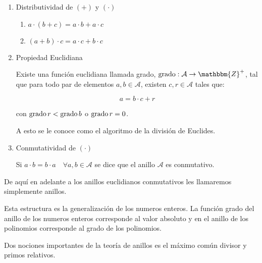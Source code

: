\begin{enumerate}
            \item Distributividad de $(+)$ y $(\cdot)$

            \begin{enumerate}
                \item $a \cdot (b + c) = a \cdot b + a \cdot c$
                \item $(a + b) \cdot c = a \cdot c + b \cdot c$
            \end{enumerate}

            \item Propiedad Euclidiana

            Existe una función euclidiana llamada grado, $\grado : \mathcal{A} \to \mathbbm{Z}^+$, tal que para todo par de elementos $a, b \in \mathcal{A}$, existen $c, r \in \mathcal{A}$ tales que:

            \begin{equation*}
                a = b \cdot c + r
            \end{equation*}

            con $\operatorname{grado}{r} < \operatorname{grado}{b}$ o $\operatorname{grado}{r} = 0$.

            A esto se le conoce como el algoritmo de la división de Euclides.
            \item Conmutatividad de $(\cdot)$

            Si $a \cdot b = b \cdot a \quad \forall a, b \in \mathcal{A}$ se dice que el anillo $\mathcal{A}$ es conmutativo.
        \end{enumerate}

        De aquí en adelante a los anillos euclidianos conmutativos les llamaremos simplemente anillos.

        Esta estructura es la generalización de los numeros enteros. La función grado del anillo de los numeros enteros corresponde al valor absoluto y en el anillo de los polinomios corresponde al grado de los polinomios.

        Dos nociones importantes de la teoría de anillos es el máximo común divisor y primos relativos.

